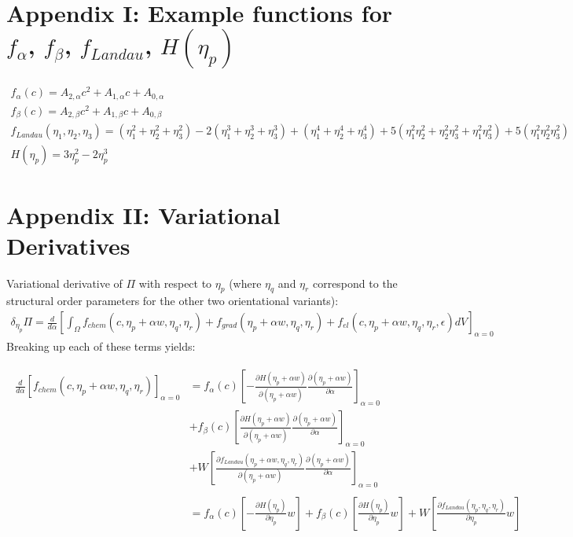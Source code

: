 \documentclass[11pt]{article}
\renewcommand{\=}[1]{\stackrel{#1}{=}} %
\theoremstyle{definition}
\theoremstyle{remark}
\begin{document}
\section{Appendix I: Example functions for $f_{\alpha}$, $f_{\beta}$, $f_{Landau}$, $H(\eta_p)$ }
\begin{gather}
f_{\alpha}(c) = A_{2, \alpha} c^2 + A_{1, \alpha} c + A_{0, \alpha} \\
f_{\beta}(c) = A_{2, \beta} c^2 + A_{1, \beta} c + A_{0, \beta} \\
f_{Landau}(\eta_1, \eta_2, \eta_3) = (\eta_1^2 + \eta_2^2 + \eta_3^2) - 2(\eta_1^3 + \eta_2^3 + \eta_3^3) +  (\eta_1^4 + \eta_2^4 + \eta_3^4) + 5 (\eta_1^2 \eta_2^2 + \eta_2^2 \eta_3^2 + \eta_1^2 \eta_3^2) +  5(\eta_1^2 \eta_2^2 \eta_3^2) \\
H(\eta_p) = 3 \eta_p^2 - 2 \eta_p^3
\end{gather}

\section{Appendix II: Variational Derivatives}
Variational derivative of $\Pi$ with respect to $\eta_p$ (where $\eta_q$ and $\eta_r$ correspond to the structural order parameters for the other two orientational variants):
\begin{gather}
\delta_{\eta_p} \Pi  =  \frac{d}{d\alpha} \left[\int_{\Omega}  f_{chem}(c,\eta_p+\alpha w,\eta_q,\eta_r) + f_{grad}(\eta_p+\alpha w,\eta_q,\eta_r) + f_{el}(c,\eta_p+\alpha w,\eta_q,\eta_r,\epsilon) dV  \right]_{\alpha=0}
\end{gather}
Breaking up each of these terms yields:

\begin{align}
\begin{split}
\frac{d}{d\alpha} \left[ f_{chem}(c,\eta_p+\alpha w,\eta_q,\eta_r)\right]_{\alpha=0} &= f_{\alpha}(c) \left[  -\frac{\partial H(\eta_p+\alpha w)}{\partial (\eta_p + \alpha w)} \frac{\partial(\eta_p + \alpha w)}{\partial \alpha} \right]_{\alpha=0} \\
&+f_{\beta}(c)  \left[  \frac{\partial H(\eta_p+\alpha w)}{\partial (\eta_p + \alpha w)} \frac{\partial(\eta_p + \alpha w)}{\partial \alpha} \right]_{\alpha=0} \\
&+ W \left[\frac{\partial f_{Landau}(\eta_p+\alpha w,\eta_q,\eta_r)}{\partial (\eta_p + \alpha w)} \frac{\partial(\eta_p + \alpha w)}{\partial \alpha} \right]_{\alpha=0}\\
\\
&=f_{\alpha}(c) \left[  -\frac{\partial H(\eta_p)}{\partial \eta_p} w \right] 
+f_{\beta}(c) \left[  \frac{\partial H(\eta_p)}{\partial \eta_p } w \right] 
+ W \left[\frac{\partial f_{Landau}(\eta_p,\eta_q,\eta_r)}{\partial \eta_p} w \right] 
\end{split}
\end{align}
\end{document}
